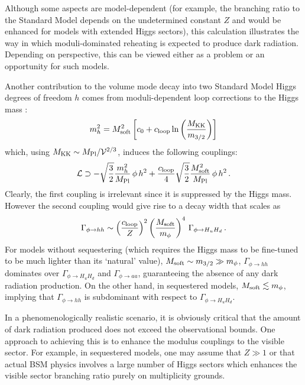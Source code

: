 Although some aspects are model-dependent (for example, the branching ratio to the Standard Model depends on the undetermined constant $Z$ and would be enhanced for models with extended Higgs sectors), this calculation illustrates the way in which moduli-dominated reheating is expected to produce dark radiation. Depending on perspective, this can be viewed either as a problem or an opportunity for such models. 

Another contribution to the volume mode decay into two Standard Model Higgs degrees of freedom $h$ comes from moduli-dependent loop corrections to the Higgs mass \cite{Cicoli:2022fzy}:
\begin{equation}
m_h^2 = M_{\rm soft}^2 \left[c_0 + c_{\rm loop} \ln\left(\frac{M_{\rm KK}}{m_{3/2}}\right)\right] 
\end{equation}
which, using $M_{\rm KK}\sim M_{\rm Pl}/\mathcal{V}^{2/3}$, induces the following couplings:
\begin{equation}
\mathcal{L}\supset -\sqrt{\frac32} \frac{m_h^2}{M_{\rm Pl}}\,\phi \,h^2 + \frac{c_{\rm loop}}{4}\sqrt{\frac32} \frac{M_{\rm soft}^2}{M_{\rm Pl}}\,\phi \,h^2\,.
\label{LoopCoupl}
\end{equation}
Clearly, the first coupling is irrelevant since it is suppressed by the Higgs mass. However the second coupling would give rise to a decay width that scales as 
\begin{equation}
\Gamma_{\phi \to hh} \sim \left(\frac{c_{\rm loop}}{Z}\right)^2 \left(\frac{M_{\rm soft}}{m_\phi}\right)^4\,\Gamma_{\phi \to H_u H_d}\,.
\end{equation}
For models without sequestering (which requires the Higgs mass to be fine-tuned to be much lighter than its `natural' value), $M_{\rm soft}\sim m_{3/2}\gg m_\phi$, $\Gamma_{\phi \to hh}$ dominates over $\Gamma_{\phi \to H_u H_d}$ and $\Gamma_{\phi \to aa}$, guaranteeing the absence of any dark radiation production. On the other hand, in sequestered models, $M_{\rm soft}\lesssim m_\phi$, implying that $\Gamma_{\phi \to hh}$ is subdominant with respect to $\Gamma_{\phi \to H_u H_d}$.

In a phenomenologically realistic scenario, it is obviously critical that the amount of dark radiation produced does not exceed the observational bounds. One approach to achieving this is to enhance the modulus couplings to the visible sector. For example, in sequestered models, one may assume that $Z \gg 1$ or that actual BSM physics involves a large number of Higgs sectors which enhances the visible sector branching ratio purely on multiplicity grounds. 

